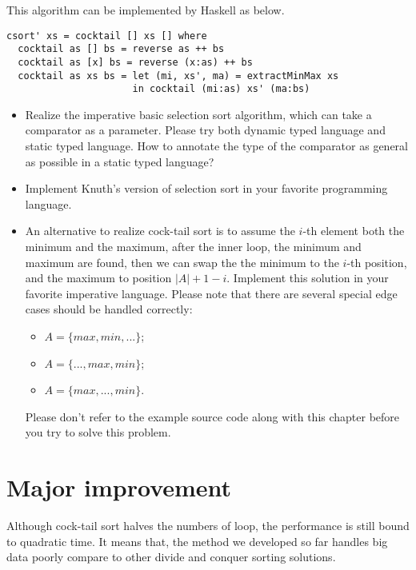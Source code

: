 \documentclass{article}
\begin{document}
This algorithm can be implemented by Haskell as below.

\lstset{language=Haskell}
\begin{lstlisting}
csort' xs = cocktail [] xs [] where
  cocktail as [] bs = reverse as ++ bs
  cocktail as [x] bs = reverse (x:as) ++ bs
  cocktail as xs bs = let (mi, xs', ma) = extractMinMax xs
                      in cocktail (mi:as) xs' (ma:bs)
\end{lstlisting}

\begin{Exercise}
  \begin{itemize}
    \item Realize the imperative basic selection sort algorithm, which can take a comparator as a parameter. Please try both dynamic typed language and static typed language. How to annotate the type of the comparator as general as possible in a static typed language?
   \item Implement Knuth's version of selection sort in your favorite programming language.
   \item An alternative to realize cock-tail sort is to assume the $i$-th element both the minimum and the maximum, after the inner loop, the minimum and maximum are found, then we can swap the the minimum to the $i$-th position, and
the maximum to position $|A|+1-i$. Implement this solution in your favorite imperative language. Please note that
there are several special edge cases should be handled correctly:
    \begin{itemize}
      \item $A = \{max, min, ...\}$;
      \item $A = \{..., max, min\}$;
      \item $A = \{max, ..., min\}$.
    \end{itemize}
    Please don't refer to the example source code along with this chapter before you try to solve this problem.
  \end{itemize}
\end{Exercise}


\section{Major improvement}

Although cock-tail sort halves the numbers of loop, the performance is still bound to quadratic time.
It means that, the method we developed so far handles big data poorly compare to other divide and conquer
sorting solutions.
\end{document}
